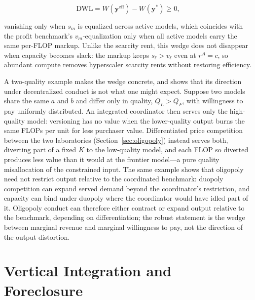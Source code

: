 \documentclass[11pt]{article}
\begin{document}
\begin{equation}\mathrm{DWL}=W(\mathbf y^{\mathrm{eff}})-W(\mathbf y^{*})\geq0,\end{equation}

vanishing only when $s_m$ is equalized across active models, which coincides with the profit benchmark's $v_m$-equalization only when all active models carry the same per-FLOP markup. Unlike the scarcity rent, this wedge does not disappear when capacity becomes slack: the markup keeps $s_\ell>v_\ell$ even at $r^A=c$, so abundant compute removes hyperscaler scarcity rents without restoring efficiency.

A two-quality example makes the wedge concrete, and shows that its direction under decentralized conduct is not what one might expect. Suppose two models share the same $a$ and $b$ and differ only in quality, $Q_L>Q_F$, with willingness to pay uniformly distributed. An integrated coordinator then serves only the high-quality model: versioning has no value when the lower-quality output burns the same FLOPs per unit for less purchaser value. Differentiated price competition between the two laboratories (Section~\ref{sec:oligopoly}) instead serves both, diverting part of a fixed $K$ to the low-quality model, and each FLOP so diverted produces less value than it would at the frontier model---a pure quality misallocation of the constrained input. The same example shows that oligopoly need not restrict output relative to the coordinated benchmark: duopoly competition can expand served demand beyond the coordinator's restriction, and capacity can bind under duopoly where the coordinator would have idled part of it. Oligopoly conduct can therefore either contract or expand output relative to the benchmark, depending on differentiation; the robust statement is the wedge between marginal revenue and marginal willingness to pay, not the direction of the output distortion.

\section{Vertical Integration and Foreclosure}
\label{sec:vertical-integration}
\label{sec:integration}
\end{document}
